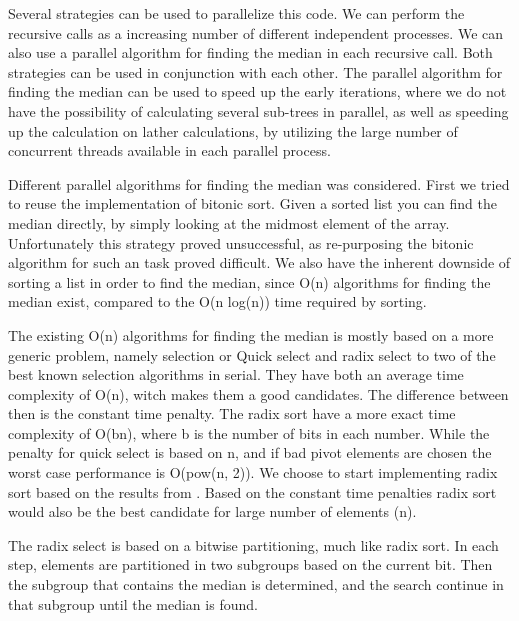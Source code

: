 Several strategies can be used to parallelize this code. We can perform the recursive calls as a increasing number of different independent processes. We can also use a parallel algorithm for finding the median in each recursive call. Both strategies can be used in conjunction with each other. The parallel algorithm for finding the median can be used to speed up the early iterations, where we do not have the possibility of calculating several sub-trees in parallel, as well as speeding up the calculation on lather calculations, by utilizing the large number of concurrent threads available in each parallel process.

Different parallel algorithms for finding the median was considered. First we tried to reuse the implementation of bitonic sort. Given a sorted list you can find the median directly, by simply looking at the midmost element of the array. Unfortunately this strategy proved unsuccessful, as re-purposing the bitonic algorithm for such an task proved difficult. We also have the inherent downside of sorting a list in order to find the median, since O(n) algorithms for finding the median exist, compared to the O(n log(n)) time required by sorting.

The existing O(n) algorithms for finding the median is mostly based on a more generic problem, namely selection or
Quick select and radix select to two of the best known selection algorithms in serial. They have both an average time complexity of O(n), witch makes them a good candidates. The difference between then is the constant time penalty. The radix sort have a more exact time complexity of O(bn), where b is the number of bits in each number. While the penalty for quick select is based on n, and if bad pivot elements are chosen the worst case performance is O(pow(n, 2)). We choose to start implementing radix sort based on the results from
. Based on the constant time penalties radix sort would also be the best candidate for large number of elements (n).

The radix select is based on a bitwise partitioning, much like radix sort. In each step, elements are partitioned in two subgroups based on the current bit. Then the subgroup that contains the median is determined, and the search continue in that subgroup until the median is found.

